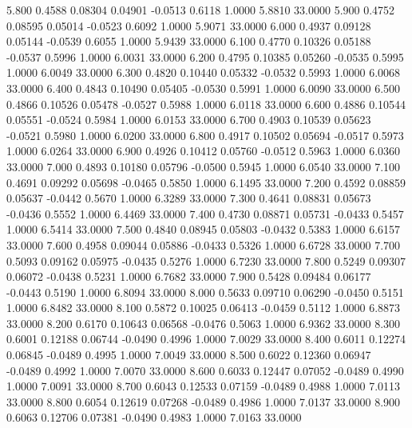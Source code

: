    5.800   0.4588   0.08304   0.04901  -0.0513   0.6118   1.0000   5.8810  33.0000
   5.900   0.4752   0.08595   0.05014  -0.0523   0.6092   1.0000   5.9071  33.0000
   6.000   0.4937   0.09128   0.05144  -0.0539   0.6055   1.0000   5.9439  33.0000
   6.100   0.4770   0.10326   0.05188  -0.0537   0.5996   1.0000   6.0031  33.0000
   6.200   0.4795   0.10385   0.05260  -0.0535   0.5995   1.0000   6.0049  33.0000
   6.300   0.4820   0.10440   0.05332  -0.0532   0.5993   1.0000   6.0068  33.0000
   6.400   0.4843   0.10490   0.05405  -0.0530   0.5991   1.0000   6.0090  33.0000
   6.500   0.4866   0.10526   0.05478  -0.0527   0.5988   1.0000   6.0118  33.0000
   6.600   0.4886   0.10544   0.05551  -0.0524   0.5984   1.0000   6.0153  33.0000
   6.700   0.4903   0.10539   0.05623  -0.0521   0.5980   1.0000   6.0200  33.0000
   6.800   0.4917   0.10502   0.05694  -0.0517   0.5973   1.0000   6.0264  33.0000
   6.900   0.4926   0.10412   0.05760  -0.0512   0.5963   1.0000   6.0360  33.0000
   7.000   0.4893   0.10180   0.05796  -0.0500   0.5945   1.0000   6.0540  33.0000
   7.100   0.4691   0.09292   0.05698  -0.0465   0.5850   1.0000   6.1495  33.0000
   7.200   0.4592   0.08859   0.05637  -0.0442   0.5670   1.0000   6.3289  33.0000
   7.300   0.4641   0.08831   0.05673  -0.0436   0.5552   1.0000   6.4469  33.0000
   7.400   0.4730   0.08871   0.05731  -0.0433   0.5457   1.0000   6.5414  33.0000
   7.500   0.4840   0.08945   0.05803  -0.0432   0.5383   1.0000   6.6157  33.0000
   7.600   0.4958   0.09044   0.05886  -0.0433   0.5326   1.0000   6.6728  33.0000
   7.700   0.5093   0.09162   0.05975  -0.0435   0.5276   1.0000   6.7230  33.0000
   7.800   0.5249   0.09307   0.06072  -0.0438   0.5231   1.0000   6.7682  33.0000
   7.900   0.5428   0.09484   0.06177  -0.0443   0.5190   1.0000   6.8094  33.0000
   8.000   0.5633   0.09710   0.06290  -0.0450   0.5151   1.0000   6.8482  33.0000
   8.100   0.5872   0.10025   0.06413  -0.0459   0.5112   1.0000   6.8873  33.0000
   8.200   0.6170   0.10643   0.06568  -0.0476   0.5063   1.0000   6.9362  33.0000
   8.300   0.6001   0.12188   0.06744  -0.0490   0.4996   1.0000   7.0029  33.0000
   8.400   0.6011   0.12274   0.06845  -0.0489   0.4995   1.0000   7.0049  33.0000
   8.500   0.6022   0.12360   0.06947  -0.0489   0.4992   1.0000   7.0070  33.0000
   8.600   0.6033   0.12447   0.07052  -0.0489   0.4990   1.0000   7.0091  33.0000
   8.700   0.6043   0.12533   0.07159  -0.0489   0.4988   1.0000   7.0113  33.0000
   8.800   0.6054   0.12619   0.07268  -0.0489   0.4986   1.0000   7.0137  33.0000
   8.900   0.6063   0.12706   0.07381  -0.0490   0.4983   1.0000   7.0163  33.0000
